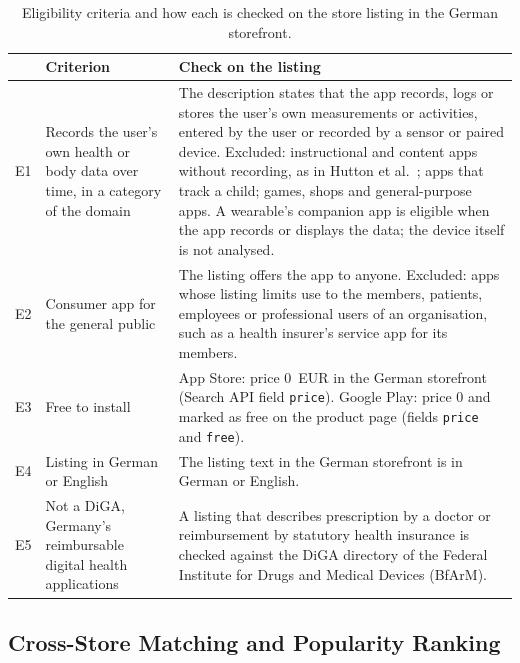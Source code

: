 \begin{table}[H]
\centering
\begin{singlespace}
\small
\caption{Eligibility criteria and how each is checked on the store listing in
the German storefront.}
\label{tab:eligibility}
\setlength{\aboverulesep}{0.4ex}\setlength{\belowrulesep}{0.65ex}
\begin{tabularx}{\textwidth}{@{}l>{\raggedright\arraybackslash}p{3.6cm}>{\raggedright\arraybackslash}X@{}}
\toprule
 & \textbf{Criterion} & \textbf{Check on the listing} \\
\midrule
E1 & Records the user's own health or body data over time, in a category of the
  domain~\parencite{robillard2019availability,malki2024exploring}
  & The description states that the app records, logs or stores the user's own
  measurements or activities, entered by the user or recorded by a sensor or
  paired device. Excluded: instructional and content apps without recording, as
  in Hutton et al.~\parencite{hutton2018assessing}; apps that track a child;
  games, shops and general-purpose apps. A wearable's companion app is eligible
  when the app records or displays the data; the device itself is not analysed. \\
\addlinespace
E2 & Consumer app for the general public
  & The listing offers the app to anyone. Excluded: apps whose listing limits use
  to the members, patients, employees or professional users of an organisation,
  such as a health insurer's service app for its members. \\
\addlinespace
E3 & Free to install
  & App Store: price 0~EUR in the German storefront (Search API field
  \texttt{price}). Google Play: price 0 and marked as free on the product page
  (fields \texttt{price} and \texttt{free}). \\
\addlinespace
E4 & Listing in German or English
  & The listing text in the German storefront is in German or English. \\
\addlinespace
E5 & Not a DiGA, Germany's reimbursable digital health applications
  & A listing that describes prescription by a doctor or reimbursement by
  statutory health insurance is checked against the DiGA directory of the
  Federal Institute for Drugs and Medical Devices (BfArM). \\
\bottomrule
\end{tabularx}
\end{singlespace}
\end{table}

\subsection{Cross-Store Matching and Popularity Ranking}
\label{sec:ranking}
